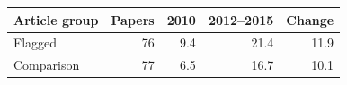 \begin{tabular}{lrrrr}
\toprule
Article group & Papers & 2010 & 2012--2015 & Change \\
\midrule
Flagged & 76 & 9.4 & 21.4 & 11.9 \\
Comparison & 77 & 6.5 & 16.7 & 10.1 \\
\bottomrule
\end{tabular}
